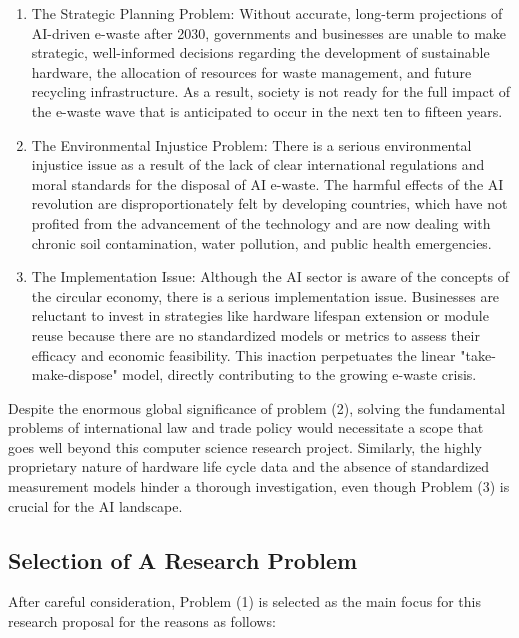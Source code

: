 \documentclass[a4paper, 12pt]{article}
\begin{document}
\begin{enumerate}
 	\item The Strategic Planning Problem: Without accurate, long-term projections of AI-driven e-waste after 2030, governments and businesses are unable to make strategic, well-informed decisions regarding the development of sustainable hardware, the allocation of resources for waste management, and future recycling infrastructure. As a result, society is not ready for the full impact of the e-waste wave that is anticipated to occur in the next ten to fifteen years.
 
	\item The Environmental Injustice Problem: There is a serious environmental injustice issue as a result of the lack of clear international regulations and moral standards for the disposal of AI e-waste.  The harmful effects of the AI revolution are disproportionately felt by developing countries, which have not profited from the advancement of the technology and are now dealing with chronic soil contamination, water pollution, and public health emergencies.
	
 	\item The Implementation Issue: Although the AI sector is aware of the concepts of the circular economy, there is a serious implementation issue.  Businesses are reluctant to invest in strategies like hardware lifespan extension or module reuse because there are no standardized models or metrics to assess their efficacy and economic feasibility.  This inaction perpetuates the linear "take-make-dispose" model, directly contributing to the growing e-waste crisis.
	
\end{enumerate}

Despite the enormous global significance of problem (2), solving the fundamental problems of international law and trade policy would necessitate a scope that goes well beyond this computer science research project.  Similarly, the highly proprietary nature of hardware life cycle data and the absence of standardized measurement models hinder a thorough investigation, even though Problem (3) is crucial for the AI landscape.

\subsection*{Selection of A Research Problem}
After careful consideration, Problem (1) is selected as the main focus for this research proposal for the reasons as follows: 
\end{document}
